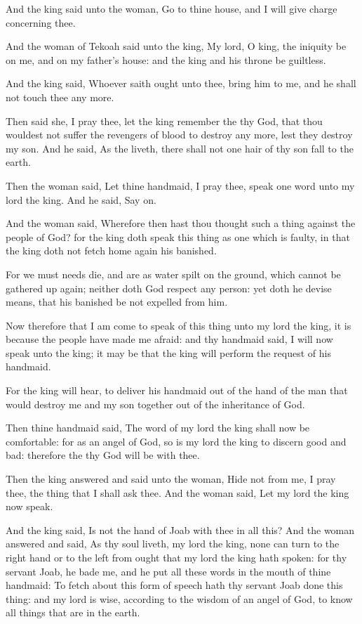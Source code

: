 \verse And the king said unto the woman, Go to thine house, and I will give charge concerning thee.

\verse And the woman of Tekoah said unto the king, My lord, O king, the iniquity be on me, and on my father's house: and the king and his throne be guiltless.

\verse And the king said, Whoever saith ought unto thee, bring him to me, and he shall not touch thee any more.

\verse Then said she, I pray thee, let the king remember the \LORD thy God, that thou wouldest not suffer the revengers of blood to destroy any more, lest they destroy my son. And he said, As the \LORD liveth, there shall not one hair of thy son fall to the earth.

\verse Then the woman said, Let thine handmaid, I pray thee, speak one word unto my lord the king. And he said, Say on.

\verse And the woman said, Wherefore then hast thou thought such a thing against the people of God? for the king doth speak this thing as one which is faulty, in that the king doth not fetch home again his banished.

\verse For we must needs die, and are as water spilt on the ground, which cannot be gathered up again; neither doth God respect any person: yet doth he devise means, that his banished be not expelled from him.

\verse Now therefore that I am come to speak of this thing unto my lord the king, it is because the people have made me afraid: and thy handmaid said, I will now speak unto the king; it may be that the king will perform the request of his handmaid.

\verse For the king will hear, to deliver his handmaid out of the hand of the man that would destroy me and my son together out of the inheritance of God.

\verse Then thine handmaid said, The word of my lord the king shall now be comfortable: for as an angel of God, so is my lord the king to discern good and bad: therefore the \LORD thy God will be with thee.

\verse Then the king answered and said unto the woman, Hide not from me, I pray thee, the thing that I shall ask thee. And the woman said, Let my lord the king now speak.

\verse And the king said, Is not the hand of Joab with thee in all this?  And the woman answered and said, As thy soul liveth, my lord the king, none can turn to the right hand or to the left from ought that my lord the king hath spoken: for thy servant Joab, he bade me, and he put all these words in the mouth of thine handmaid: \verse To fetch about this form of speech hath thy servant Joab done this thing: and my lord is wise, according to the wisdom of an angel of God, to know all things that are in the earth.

